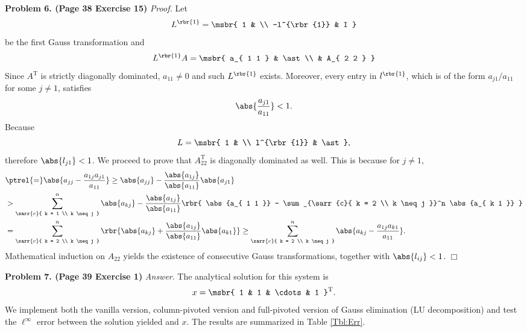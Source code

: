 \documentclass[english, nochinese]{pnote}
\begin{document}
\textbf{Problem 6. (Page 38 Exercise 15)} \textit{Proof.} Let
\begin{equation}
L^{\rbr{1}} = \msbr{ 1 & \\ -l^{\rbr{1}} & I }
\end{equation}
be the first Gauss transformation and
\begin{equation}
L^{\rbr{1}} A = \msbr{ a_{ 1 1 } & \ast \\ & A_{ 2 2 } }
\end{equation}
Since $A^{\text{T}}$ is strictly diagonally dominated, $ a_{ 1 1 } \neq 0 $ and such $L^{\rbr{1}}$ exists.
Moreover, every entry in $l^{\rbr{1}}$, which is of the form $ a_{ j 1 } / a_{ 1 1 } $ for some $ j \neq 1 $, satisfies
\begin{equation}
\abs{\frac{a_{ j 1 }}{a_{ 1 1 }}} < 1.
\end{equation}
Because
\begin{equation}
L = \msbr{ 1 & \\ l^{\rbr{1}} & \ast },
\end{equation}
therefore $ \abs{l_{ j 1 }} < 1 $. We proceed to prove that $ A_{ 2 2 }^{\text{T}} $ is diagonally dominated as well. This is because for $ j \neq 1 $,
\begin{equation}
\begin{split}
&\ptrel{=} \abs{ a_{ j j } - \frac{ a_{ 1 j } a_{ j 1 } }{ a_{ 1 1 } }} \ge \abs{a_{ j j }} - \frac{\abs{a_{ 1 j }}}{\abs{a_{ 1 1 }}} \abs{a_{ j 1 }} \\
&> \sum_{\sarr{c}{ k = 1 \\ k \neq j }}^n \abs{a_{ k j }} - \frac{\abs{a_{ 1 j }}}{\abs{a_{ 1 1 }}} \rbr{ \abs{a_{ 1 1 }} - \sum_{\sarr{c}{ k = 2 \\ k \neq j }}^n \abs{a_{ k 1 }} } \\
&= \sum_{\sarr{c}{ k = 2 \\ k \neq j }}^n \rbr{ \abs{a_{ k j }} + \frac{\abs{a_{ 1 j }}}{\abs{a_{ 1 1 }}} \abs{a_{ k 1 }} } \ge \sum_{\sarr{c}{ k = 2 \\ k \neq j }}^n \abs{ a_{ k j } - \frac{ a_{ 1 j } a_{ k 1 } }{a_{ 1 1 }}}.
\end{split}
\end{equation}
Mathematical induction on $ A_{ 2 2 } $ yields the existence of consecutive Gauss transformations, together with $ \abs{l_{ i j }} < 1 $.
\hfill$\Box$

\textbf{Problem 7. (Page 39 Exercise 1)} \textit{Answer}. The analytical solution for this system is
\begin{equation}
x = \msbr{ 1 & 1 & \cdots & 1 }^{\text{T}}.
\end{equation}
We implement both the vanilla version, column-pivoted version and full-pivoted version of Gauss elimination (LU decomposition) and test the $\ell^{\infty}$ error between the solution yielded and $x$. The results are summarized in Table \ref{Tbl:Err}.
\end{document}
